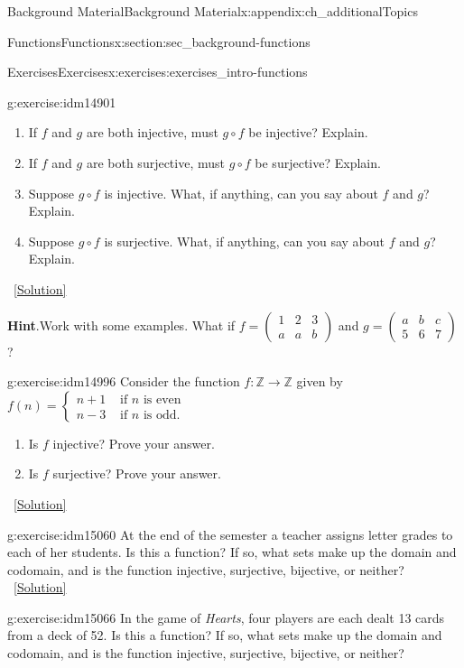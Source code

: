 \documentclass[oneside,10pt,]{book}
\numberwithin{equation}{chapter}
\def\Z{\mathbb Z}
\newcommand{\twoline}[2]{\begin{pmatrix}#1 \\ #2 \end{pmatrix}}
\newcommand{\amp}{&}
\begin{document}
\begin{appendixptx}{Background Material}{}{Background Material}{}{}{x:appendix:ch_additionalTopics}
\begin{sectionptx}{Functions}{}{Functions}{}{}{x:section:sec_background-functions}
\begin{exercises-subsection}{Exercises}{}{Exercises}{}{}{x:exercises:exercises_intro-functions}
\begin{divisionexercise}{13}{}{}{g:exercise:idm14901}
%
\begin{enumerate}[label=(\alph*)]
\item{}If \(f\) and \(g\) are both injective, must \(g\circ f\) be injective?  Explain.%
\item{}If \(f\) and \(g\) are both surjective, must \(g\circ f\) be surjective?  Explain.%
\item{}Suppose \(g\circ f\) is injective.  What, if anything, can you say about \(f\) and \(g\)?  Explain.%
\item{}Suppose \(g\circ f\) is surjective.  What, if anything, can you say about \(f\) and \(g\)?  Explain.%
\end{enumerate}
%
\qquad~\hfill{\tiny\hyperlink{g:solution:idm14943-main}{[Solution]}}\par\smallskip%
\noindent\textbf{Hint}.\hypertarget{g:hint:idm14939}{}\quad{}Work with some examples.  What if \(f = \twoline{1\amp 2 \amp 3}{a \amp a \amp b}\) and \(g = \twoline{a\amp b \amp c}{5 \amp 6 \amp 7}\)?%
\end{divisionexercise}%
\begin{divisionexercise}{14}{}{}{g:exercise:idm14996}%
Consider the function \(f:\Z \to \Z\) given by \(f(n) = \begin{cases}n+1 \amp  \text{ if }n\text{ is even} \\ n-3 \amp \text{ if }n\text{ is odd} . \end{cases}\)%
\begin{enumerate}[label=(\alph*)]
\item{}Is \(f\) injective? Prove your answer.%
\item{}Is \(f\) surjective? Prove your answer.%
\end{enumerate}
%
\qquad~\hfill{\tiny\hyperlink{g:solution:idm15008-main}{[Solution]}}\end{divisionexercise}%
\begin{divisionexercise}{15}{}{}{g:exercise:idm15060}%
At the end of the semester a teacher assigns letter grades to each of her students. Is this a function? If so, what sets make up the domain and codomain, and is the function injective, surjective, bijective, or neither?%
\qquad~\hfill{\tiny\hyperlink{g:solution:idm15063-main}{[Solution]}}\end{divisionexercise}%
\begin{divisionexercise}{16}{}{}{g:exercise:idm15066}%
In the game of \emph{Hearts}, four players are each dealt 13 cards from a deck of 52. Is this a function? If so, what sets make up the domain and codomain, and is the function injective, surjective, bijective, or neither?%

\end{divisionexercise}
\end{exercises-subsection}
\end{sectionptx}
\end{appendixptx}
\end{document}
